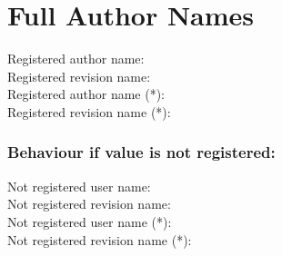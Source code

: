 \section{Full Author Names}

Registered author name: \svnFullAuthor{\svnfileauthor}\\
Registered revision name: \svnFullRevision{\svnfilerev}\\
Registered author name (*): \svnFullAuthor*{\svnfileauthor}\\
Registered revision name (*): \svnFullRevision*{\svnfilerev}\\

\subsubsection*{Behaviour if value is not registered:}
Not registered user name: \\
Not registered revision name: \\
Not registered user name (*): \\
Not registered revision name (*): \\


